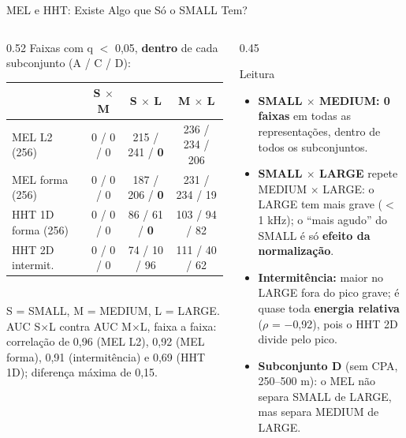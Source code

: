 \documentclass[aspectratio=169]{beamer}
\begin{document}
\begin{frame}{MEL e HHT: Existe Algo que Só o SMALL Tem?}
    \footnotesize
    \begin{columns}[T]
        \begin{column}{0.52\textwidth}
            \scriptsize
            Faixas com q $<$ 0,05, \textbf{dentro} de cada subconjunto (A / C / D):\\[3pt]
            \tiny
            \setlength{\tabcolsep}{2.5pt}
            \begin{tabular}{@{}lccc@{}}
                \toprule
                & S $\times$ M & S $\times$ L & M $\times$ L \\
                \midrule
                MEL L2 (256) & 0 / 0 / 0 & 215 / 241 / \textbf{0} & 236 / 234 / 206 \\
                MEL forma (256) & 0 / 0 / 0 & 187 / 206 / \textbf{0} & 231 / 234 / 19 \\
                HHT 1D forma (256) & 0 / 0 / 0 & 86 / 61 / \textbf{0} & 103 / 94 / 82 \\
                HHT 2D intermit. & 0 / 0 / 0 & 74 / 10 / 96 & 111 / 40 / 62 \\
                \bottomrule
            \end{tabular}\\[4pt]
            \tiny S = SMALL, M = MEDIUM, L = LARGE. AUC S$\times$L contra AUC M$\times$L, faixa a faixa: correlação de 0,96 (MEL L2), 0,92 (MEL forma), 0,91 (intermitência) e 0,69 (HHT 1D); diferença máxima de 0,15.
        \end{column}
        \begin{column}{0.45\textwidth}
            \begin{block}{\small Leitura}
                \scriptsize
                \begin{itemize}
                    \setlength{\itemsep}{2pt}
                    \item \textbf{SMALL $\times$ MEDIUM: 0 faixas} em todas as representações, dentro de todos os subconjuntos.
                    \item \textbf{SMALL $\times$ LARGE} repete MEDIUM $\times$ LARGE: o LARGE tem mais grave ($<$ 1 kHz); o ``mais agudo'' do SMALL é só \textbf{efeito da normalização}.
                    \item \textbf{Intermitência:} maior no LARGE fora do pico grave; é quase toda \textbf{energia relativa} ($\rho$ = $-$0,92), pois o HHT 2D divide pelo pico.
                    \item \textbf{Subconjunto D} (sem CPA, 250--500 m): o MEL não separa SMALL de LARGE, mas separa MEDIUM de LARGE.
                \end{itemize}
            \end{block}
        \end{column}
    \end{columns}
\end{frame}
\end{document}
